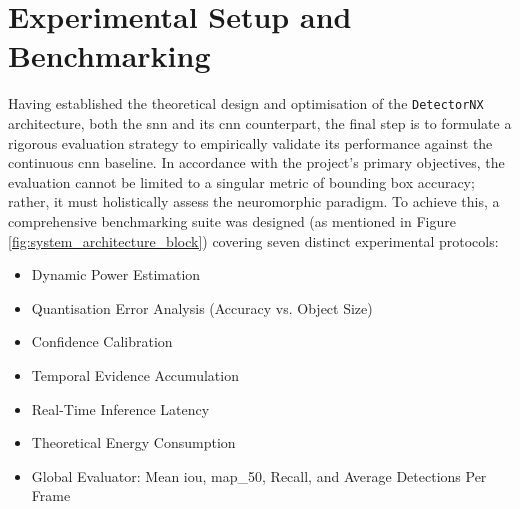 \section{Experimental Setup and Benchmarking}
\label{sec:experimental_setup}

Having established the theoretical design and optimisation of the \texttt{DetectorNX} architecture, both the \gls{snn} and its \gls{cnn} counterpart,
the final step is to formulate a rigorous evaluation strategy to empirically validate its performance against the continuous \gls{cnn} baseline.
In accordance with the project's primary objectives, the evaluation cannot be limited to a singular metric of bounding box accuracy; rather, it must holistically assess the neuromorphic paradigm.
To achieve this, a comprehensive benchmarking suite was designed (as mentioned in Figure \ref{fig:system_architecture_block}) covering seven distinct experimental protocols:
\begin{itemize}
    \item Dynamic Power Estimation
    \item Quantisation Error Analysis (Accuracy vs. Object Size)
    \item Confidence Calibration
    \item Temporal Evidence Accumulation
    \item Real-Time Inference Latency
    \item Theoretical Energy Consumption
    \item Global Evaluator: Mean \gls{iou}, \gls{map_50}, Recall, and Average Detections Per Frame
\end{itemize}








